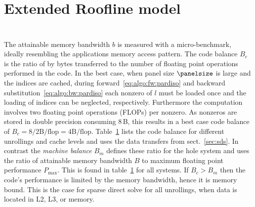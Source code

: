 \section{Extended Roofline model }

\begin{table}[tp]
  \centering
  \small
  \begin{tabular}{l|ccccccccccccccccccccccccccccccccc}
  \end{tabular}
  \caption{}
  \label{tab:mrm:bc}
\end{table}

%
The attainable memory bandwidth $b$ is measured with a micro-benchmark,
ideally resembling the applications memory access pattern. 
%
The code balance $B_c$ is the ratio of by bytes transferred to the number of
floating point operations performed in the code.
In the best case, when panel size $\panelsize$ is large and the indices are
cached, during forward~\eqref{eq:algo:fw:pardiso} and backward
substitution~\eqref{eq:algo:bw:pardiso} each nonzero of $l$ must be loaded once
and the loading of indices can be neglected,
respectively. 
Furthermore the computation involves two floating point operations (FLOPs) per
nonzero.
As nonzeros are stored in double precision consuming $8$\,B, this results in a
best case code balance of $B_c = 8 / 2 \text{B/flop} = 4 \text{B/flop}$.
Table~\ref{tab:mrm:bc} lists the code balance for different unrollings and cache
levels and uses the data transfers from sect.~\ref{sec:sds}.
%
In contrast the \textit{machine balance} $B_m$ defines these ratio for the hole system
and uses the ratio of attainable memory bandwidth $B$ to maximum floating point
performance $P_\text{max}$.
This is found in table~\ref{} for all systems.
%
If $B_c > B_m$ then the code's performance is limited by the memory bandwidth,
hence it is memory bound.
This is the case for sparse direct solve for all unrollings, when data is
located in L2, L3, or memory.

